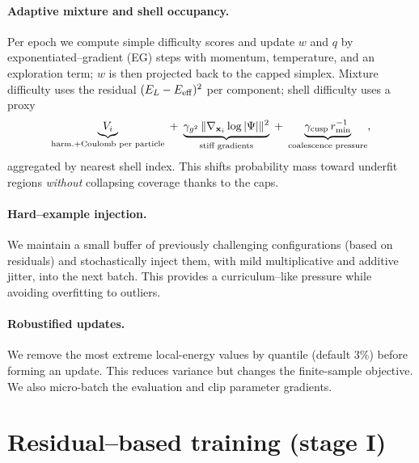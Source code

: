 \paragraph{Adaptive mixture and shell occupancy.}
Per epoch we compute simple difficulty scores and update $w$ and $q$ by exponentiated–gradient (EG) steps with momentum, temperature, and an exploration term; $w$ is then projected back to the capped simplex. Mixture difficulty uses the residual $(E_L-E_{\rm eff})^2$ per component; shell difficulty uses a proxy
\[
\underbrace{V_i}_{\text{harm.+Coulomb per particle}}
\;+\; \underbrace{\gamma_{g^2}\,\|\nabla_{\mathbf x_i}\log|\Psi|\|^2}_{\text{stiff gradients}}
\;+\; \underbrace{\gamma_{\rm cusp}\,r_{\min}^{-1}}_{\text{coalescence pressure}},
\]
aggregated by nearest shell index. This shifts probability mass toward underfit regions \emph{without} collapsing coverage thanks to the caps.

\paragraph{Hard–example injection.}
We maintain a small buffer of previously challenging configurations (based on residuals) and stochastically inject them, with mild multiplicative and additive jitter, into the next batch. This provides a curriculum–like pressure while avoiding overfitting to outliers.

\paragraph{Robustified updates.}
We remove the most extreme local-energy values by quantile (default $3\%$) before forming
an update. This reduces variance but changes the finite-sample objective. We also micro-batch
the evaluation and clip parameter gradients.

\section{Residual–based training (stage I)}
\label{sec:residual-stage}

